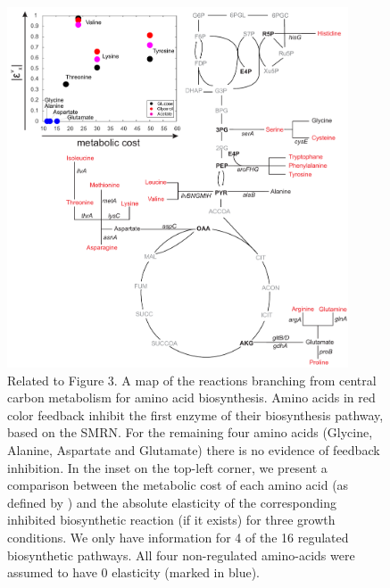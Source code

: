 \documentclass[12pt,a4paper]{article}
\begin{document}
\begin{figure}[ht!]
	\includegraphics[width=0.9\textwidth]{../manuscript/FigureS4new.pdf}
	\caption{Related to Figure 3. A map of the reactions branching from central carbon metabolism for amino acid biosynthesis. Amino acids in red color feedback inhibit the first enzyme of their biosynthesis pathway, based on the SMRN. For the remaining four amino acids (Glycine, Alanine, Aspartate and Glutamate) there is no evidence of feedback inhibition. In the inset on the top-left corner, we present a comparison between the metabolic cost of each amino acid (as defined by \cite{Akashi2002-ew}) and the absolute elasticity of the corresponding inhibited biosynthetic reaction (if it exists) for three growth conditions. We only have information for 4 of the 16 regulated biosynthetic pathways. All four non-regulated amino-acids were assumed to have 0 elasticity (marked in blue).}\label{fig:SI_biosynthesis}
\end{figure}
\end{document}
